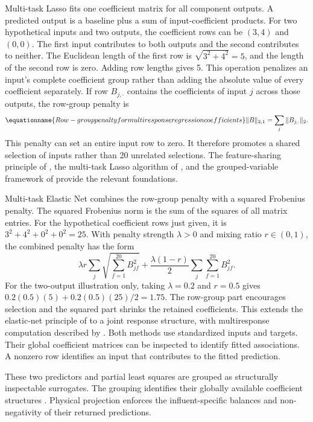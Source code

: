 Multi-task Lasso fits one coefficient matrix for all component outputs. A predicted output is a baseline plus a sum of input-coefficient products. For two hypothetical inputs and two outputs, the coefficient rows can be $(3,4)$ and $(0,0)$. The first input contributes to both outputs and the second contributes to neither. The Euclidean length of the first row is $\sqrt{3^2+4^2}=5$, and the length of the second row is zero. Adding row lengths gives 5. This operation penalizes an input's complete coefficient group rather than adding the absolute value of every coefficient separately. If row $B_{j,\cdot}$ contains the coefficients of input $j$ across those outputs, the row-group penalty is
\begin{equation}
\equationname{Row-group penalty for multiresponse regression coefficients}
\|B\|_{2,1}=\sum_j\|B_{j,\cdot}\|_2.
\label{eq:multiresponse_row_penalty}
\end{equation}
This penalty can set an entire input row to zero. It therefore promotes a shared selection of inputs rather than 20 unrelated selections. The feature-sharing principle of \citet{Argyriou2008}, the multi-task Lasso algorithm of \citet{Liu2009}, and the grouped-variable framework of \citet{Yuan2006} provide the relevant foundations.

Multi-task Elastic Net combines the row-group penalty with a squared Frobenius penalty. The squared Frobenius norm is the sum of the squares of all matrix entries. For the hypothetical coefficient rows just given, it is $3^2+4^2+0^2+0^2=25$. With penalty strength $\lambda>0$ and mixing ratio $r\in(0,1)$, the combined penalty has the form
\[
\lambda r\sum_j\sqrt{\sum_{f=1}^{20}B_{jf}^2}
+\frac{\lambda(1-r)}2\sum_j\sum_{f=1}^{20}B_{jf}^2.
\]
For the two-output illustration only, taking $\lambda=0.2$ and $r=0.5$ gives $0.2(0.5)(5)+0.2(0.5)(25)/2=1.75$. The row-group part encourages selection and the squared part shrinks the retained coefficients. This extends the elastic-net principle of \citet{Zou2005} to a joint response structure, with multiresponse computation described by \citet{Simon2013}. Both methods use standardized inputs and targets. Their global coefficient matrices can be inspected to identify fitted associations. A nonzero row identifies an input that contributes to the fitted prediction.

These two predictors and partial least squares are grouped as structurally inspectable surrogates. The grouping identifies their globally available coefficient structures \citep{Rudin2019}. Physical projection enforces the influent-specific balances and non-negativity of their returned predictions.

